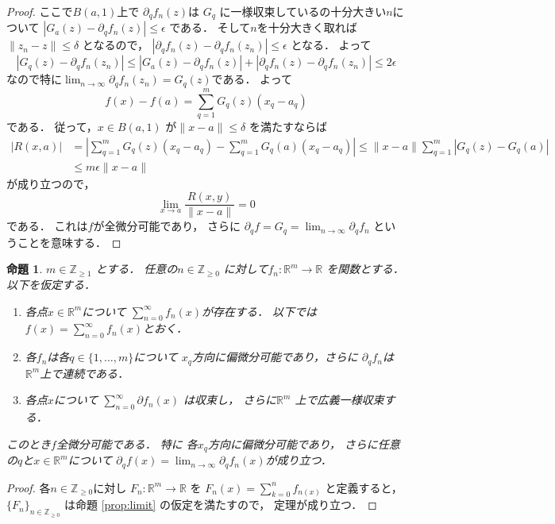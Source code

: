 \documentclass[leqno, a4paper, 12pt]{jsarticle}
\newtheorem{prop}[thm]{命題}
\newcommand{\zz}{\mathbb{Z}}
\newcommand{\rr}{\mathbb{R}}
\begin{document}
\begin{proof}
ここで$B(a, 1)$上で
$\partial_{q}f_{n}(z)$は
$G_{q}$
に一様収束しているの十分大きい$n$について
$ |G_{a}(z)-\partial_{q}f_{n}(z)|\le \epsilon$
である．
そして$n$を十分大きく取れば$\|z_{n}-z\|\le \delta$
となるので，
$|\partial_{q}f_{n}(z)-\partial_{q}f_{n}(z_{n})|\le \epsilon$
となる．
よって
\[
|G_{q}(z)-\partial_{q}f_{n}(z_{n})|
\le |G_{a}(z)-\partial_{q}f_{n}(z)|+
|\partial_{q}f_{n}(z)-\partial_{q}f_{n}(z_{n})|
\le 2\epsilon
\]
なので特に$\lim_{n\to \infty}\partial_{q}f_{n}(z_{n})=G_{q}(z)$である．
よって
\[
f(x)-f(a)=\sum_{q=1}^{m}G_{q}(z)(x_{q}-a_{q})
\]
である．
従って，$x\in B(a, 1)$
が$\|x-a\|\le \delta$
を満たすならば
\begin{align*}
|R(x, a)|&=
\left|
\sum_{q=1}^{m}G_{q}(z)(x_{q}-a_{q})-\sum_{q=1}^{m}G_{q}(a)(x_{q}-a_{q})
\right|
\le \|x-a\|\sum_{q=1}^{m}|G_{q}(z)-G_{q}(a)|\\
&\le
m\epsilon\|x-a\|
\end{align*}
が成り立つので，
\[
\lim_{x\to a}\frac{R(x, y)}{\|x-a\|}=0
\]
である．
これは$f$が全微分可能であり，
さらに
$\partial_{q}f=G_{q}=\lim_{n\to \infty}\partial_{q}f_{n}$
ということを意味する．
\end{proof}


\begin{prop}\label{prop:sumsum}
$m\in \zz_{\ge 1}$
とする．
任意の$n\in \zz_{\ge 0}$
に対して$f_{n}\colon \rr^{m}\to \rr$
を関数とする．
以下を仮定する．
\begin{enumerate}
\item
各点$x\in \rr^{m}$について
$\sum_{n=0}^{\infty}f_{n}(x)$が存在する．
以下では$f(x)=\sum_{n=0}^{\infty}f_{n}(x)$とおく．
\item 
各$f_{n}$は各$q\in \{1, \dots, m\}$について
$x_{q}$方向に偏微分可能であり，さらに
$\partial_{q}f_{n}$は$\rr^{m}$上で連続である．
\item 
各点$x$について
$\sum_{n=0}^{\infty}\partial f_{n}(x)$
は収束し，
さらに$\rr^{m}$
上で広義一様収束する．

\end{enumerate}
このとき$f$全微分可能である．
特に
各$x_{q}$方向に偏微分可能であり，
さらに任意の$q$と$x\in \rr^{m}$について
$\partial_{q}f(x)=
\lim_{n\to \infty}\partial_{q}f_{n}(x)$が成り立つ．
\end{prop}
\begin{proof}
各$n\in\zz_{\ge 0}$に対し
$F_{n}\colon \rr^{m}\to \rr$
を
$F_{n}(x)=\sum_{k=0}^{n}f_{n(x)}$
と定義すると，
$\{F_{n}\}_{n\in \zz_{\ge 0}}$
は命題 \ref{prop:limit}
の仮定を満たすので，
定理が成り立つ．
\end{proof}
\end{document}
